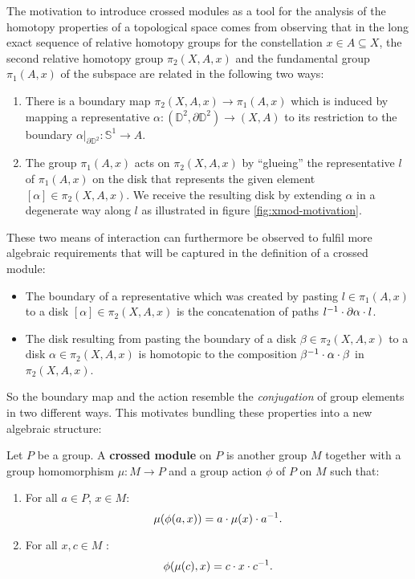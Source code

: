 The motivation to introduce crossed modules as a tool for the analysis of the
homotopy properties of a topological space comes from observing that in the
long exact sequence of relative homotopy groups for the constellation 
$x \in A \subseteq X$,
the second relative homotopy group $\pi_2(X, A, x)$ and the fundamental group
$\pi_1(A, x)$ of the subspace are related in the following two ways:
\begin{enumerate}
\item There is a boundary map $\pi_2(X, A, x) \to \pi_1(A, x)$ which is induced
by mapping a representative $\alpha : (\mathbb{D}^2, \partial \mathbb{D}^2) \to 
(X, A)$ to its restriction to the boundary $\left.\alpha\right|_{\partial \mathbb{D}^2}
: \mathbb{S}^1 \to A$.
\item The group $\pi_1(A, x)$ acts on $\pi_2(X, A, x)$ by ``glueing'' the
representative $l$ of $\pi_1(A, x)$ on the disk that represents the given
element $[\alpha] \in \pi_2(X, A, x)$.
We receive the resulting disk by extending $\alpha$ in a degenerate way along
$l$ as illustrated in figure \ref{fig:xmod-motivation}.
\end{enumerate}
These two means of interaction can furthermore be observed to fulfil more algebraic
requirements that will be captured in the definition of a crossed module:
\begin{itemize}
\item The boundary of a representative which was created by pasting $l \in \pi_1(A, x)$
to a disk $[\alpha] \in \pi_2(X, A, x)$ is the
concatenation of paths $l^{-1} \cdot \partial \alpha \cdot l$.
\item The disk resulting from pasting the boundary of a disk $\beta \in \pi_2(X, A, x)$
to a disk $\alpha \in \pi_2(X, A, x)$ is homotopic to the composition
$\beta^{-1} \cdot \alpha \cdot \beta$ in $\pi_2(X, A, x)$.
\end{itemize}
So the boundary map and the action resemble the \emph{conjugation} of group elements
in two different ways. This motivates bundling these properties into a new algebraic
structure:

\begin{defn}
Let $P$ be a group. A \textbf{crossed module} on $P$ is another group $M$ together
with a group homomorphism $\mu : M \to P$ and a group action $\phi$ of $P$ on
$M$ such that:
\begin{enumerate}
\item For all $a \in P$, $x \in M$:
\begin{equation} \label{eq:gp-CM1}
\mu(\phi(a,x)) = a \cdot \mu(x) \cdot a\inv \text{.} %
\end{equation}
\item For all $x, c \in M$ :
\begin{equation} \label{eq:gp-CM2}
\phi(\mu(c),x) = c \cdot x \cdot c^{-1} \text{.}
\end{equation}
\end{enumerate}
\end{defn}

